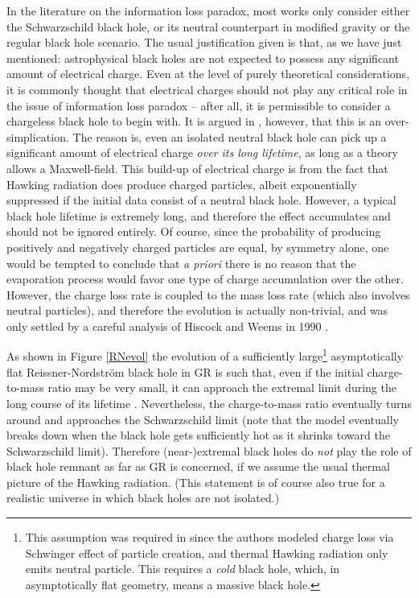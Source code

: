 \documentclass[12pt]{article}
\newcommand{\2}{$^2$}
\newcommand{\3}{$^3$}
\newcommand{\4}{$_4$}
\newcommand{\5}{$_5$}
\begin{document}
In the literature on the information loss paradox, most works only consider either the Schwarzschild black hole, or its neutral counterpart in modified gravity or the regular black hole scenario. The usual justification given is that, as we have just mentioned: astrophysical black holes are not expected to possess any significant amount of electrical charge. Even at the level of purely theoretical considerations, it is commonly thought that electrical charges should not play any critical role in the issue of information loss paradox -- after all, it is permissible to consider a chargeless black hole to begin with. It is argued in \cite{OMC, OC}, however, that this is an over-simplication. The reason is, even an isolated neutral black hole can pick up a significant amount of electrical charge \emph{over its long lifetime}, as long as a theory allows a Maxwell-field. This build-up of electrical charge is from the fact that Hawking radiation does produce charged particles, albeit exponentially suppressed if the initial data consist of a neutral black hole. However, a typical black hole lifetime is extremely long, and therefore the effect accumulates and should not be ignored entirely. Of course, since the probability of producing positively and negatively charged particles are equal, by symmetry alone, one would be tempted to conclude that \emph{a priori} there is no reason that the evaporation process would favor one type of charge accumulation over the other. However, the charge loss rate is coupled to the mass loss rate (which also involves neutral particles), and therefore the evolution is actually non-trivial, and was only settled by a careful analysis of Hiscock and Weems in 1990 \cite{kn:HW}.

As shown in Figure \ref{RNevol} the evolution of a sufficiently large\footnote{This assumption was required in \cite{kn:HW} since the authors modeled charge loss via Schwinger effect of particle creation, and thermal Hawking radiation only emits neutral particle. This requires a \emph{cold} black hole, which, in asymptotically flat geometry, means a massive black hole.} asymptotically flat Reissner-Nordstr\"om black hole in GR is such that, even if the initial charge-to-mass ratio may be very small, it can approach the extremal limit during the long course of its lifetime \cite{kn:HW, kn:SP}. Nevertheless, the charge-to-mass ratio eventually turns around and approaches the Schwarzschild limit (note that the model eventually breaks down when the black hole gets sufficiently hot as it shrinks toward the Schwarzschild limit). Therefore (near-)extremal black holes do \emph{not} play the role of black hole remnant as far as GR is concerned, if we assume the usual thermal picture of the Hawking radiation. (This statement is of course also true for a realistic universe in which black holes are not isolated.)
\end{document}
